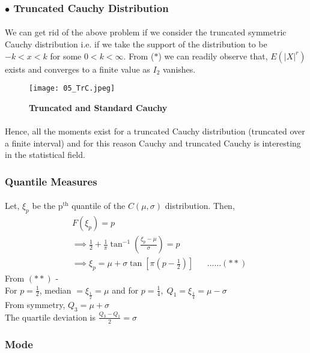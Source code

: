 \documentclass[12pt, fleqn, a4paper]{article}
\newcommand{\chy}{\(\mathit{C}(\mu, \sigma)\) }
\begin{document}
	\subsubsection*{\(\bullet\) Truncated Cauchy Distribution}
	\paragraph{} We can get rid of the above problem if we consider the truncated symmetric Cauchy distribution i.e. if we take the support of the distribution to be \(-k<x<k\) for some \(0<k<\infty\). From (\(*\)) we can readily observe that, \(E\left(|X|^r\right)\) exists and converges to a finite value as \(I_2\) vanishes. 
	\begin{figure}[H] \centering
		\texttt{[image: 05\_TrC.jpeg]}
		\caption{\textbf{Truncated and Standard Cauchy}}
	\end{figure}
	\paragraph{} Hence, all the moments exist for a truncated Cauchy distribution (truncated over a finite interval) and for this reason Cauchy and truncated Cauchy is interesting in the statistical field. 
	
	
	\subsubsection{Quantile Measures}
	\paragraph{} Let, \(\xi_p\) be the \(\mathrm{p^{th}}\) quantile of the \chy distribution. Then, 
	\begin{align*}
		& F(\xi_p)=p \\
		& \implies \frac{1}{2}+\frac{1}{\pi}\tan^{-1}\left(\frac{\xi_p-\mu}{\sigma}\right)=p \\
		& \implies \xi_p = \mu+\sigma\tan\left[\pi\left(p-\frac{1}{2}\right)\right] && \ldots\ldots (**)
	\end{align*}
	From \((**)\) - \\
	For \(p=\frac{1}{2}\), median \(=\xi_\frac{1}{2}=\mu\) and for \(p=\frac{1}{4},\;Q_1=\xi_\frac{1}{4}=\mu-\sigma\) \\ From symmetry, \(Q_3=\mu+\sigma\) \\[10pt]
	The quartile deviation is \(\frac{Q_3-Q_1}{2}=\sigma\)
	
	\subsubsection{Mode}
\end{document}
